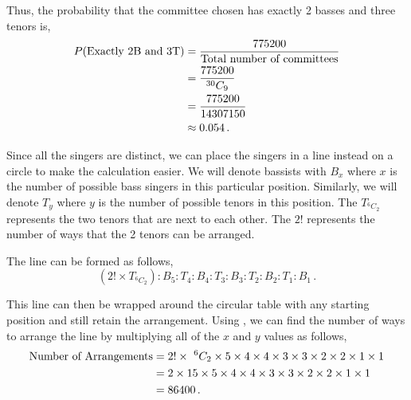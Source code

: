 \begin{subquestions}
\begin{subsubquestions}
Thus, the probability that the committee chosen has exactly 2 basses and three tenors is,
\begin{align}
	P(\text{Exactly 2B and 3T}) & = \frac{775200}{\text{Total number of committees}} \nonumber \\
	                            & = \frac{775200}{^{30}C_9} \nonumber \\
	                            & = \frac{775200}{14307150} \nonumber \\
	                            & \approx 0.054 \,.
\end{align}


\subsubquestion 

Since all the singers are distinct, we can place the singers in a line instead on a circle to make the calculation easier. We will denote bassists with $B_x$ where $x$ is the number of possible bass singers in this particular position. Similarly, we will denote $T_y$ where $y$ is the number of possible tenors in this position. The $T_{^6C_2}$ represents the two tenors that are next to each other. The $2!$ represents the number of ways that the 2 tenors can be arranged.

The line can be formed as follows,
\begin{equation}
	(2! \times T_{^6C_2}):B_5: T_4: B_4: T_3: B_3: T_2: B_2: T_1: B_1 \,.
\end{equation}

This line can then be wrapped around the circular table with any starting position and still retain the arrangement. Using , we can find the number of ways to arrange the line by multiplying all of the $x$ and $y$ values as follows,
\begin{align}
	\text{Number of Arrangements} & = 2! \times ~^6C_2 \times 5\times 4\times 4\times 3\times 3\times 2\times 2\times 1\times 1 \nonumber \\
	                       & = 2 \times 15 \times 5\times 4\times 4\times 3\times 3\times 2\times 2\times 1\times 1 \nonumber \\
	                       & = 86400 \,.
\end{align}

\end{subsubquestions}
	
	
	
\end{subquestions}